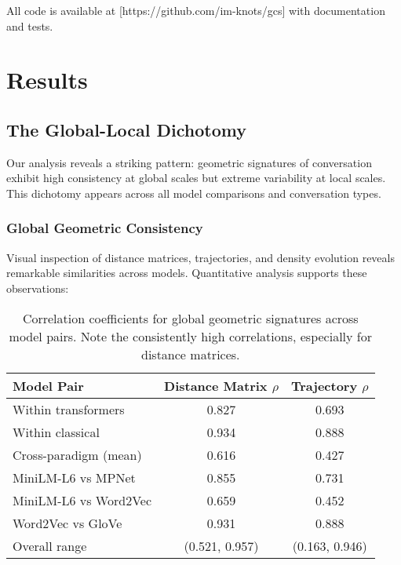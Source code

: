 \documentclass[11pt,letterpaper]{article}
\newcommand{\distanceCorrRange}{(0.521, 0.957)}
\newcommand{\transformerInternalCorr}{0.827}
\newcommand{\classicalInternalCorr}{0.934}
\newcommand{\crossParadigmCorr}{0.616}
\newcommand{\miniLMmpnetCorr}{0.855}
\newcommand{\miniLMwordTovecCorr}{0.659}
\newcommand{\wordTovecGloveCorr}{0.931}
\begin{document}
All code is available at [https://github.com/im-knots/gcs] with documentation and tests.

\section{Results}

\subsection{The Global-Local Dichotomy}

Our analysis reveals a striking pattern: geometric signatures of conversation exhibit high consistency at global scales but extreme variability at local scales. This dichotomy appears across all model comparisons and conversation types.

\subsubsection{Global Geometric Consistency}

Visual inspection of distance matrices, trajectories, and density evolution reveals remarkable similarities across models. Quantitative analysis supports these observations:

\begin{table}[h]
\centering
\begin{tabular}{lcc}
\toprule
Model Pair & Distance Matrix $\rho$ & Trajectory $\rho$ \\
\midrule
Within transformers & \transformerInternalCorr{} & 0.693 \\
Within classical & \classicalInternalCorr{} & 0.888 \\
Cross-paradigm (mean) & \crossParadigmCorr{} & 0.427 \\
\midrule
MiniLM-L6 vs MPNet & \miniLMmpnetCorr{} & 0.731 \\
MiniLM-L6 vs Word2Vec & \miniLMwordTovecCorr{} & 0.452 \\
Word2Vec vs GloVe & \wordTovecGloveCorr{} & 0.888 \\
\midrule
Overall range & \distanceCorrRange{} & (0.163, 0.946) \\
\bottomrule
\end{tabular}
\caption{Correlation coefficients for global geometric signatures across model pairs. Note the consistently high correlations, especially for distance matrices.}
\label{tab:correlations}
\end{table}
\end{document}

